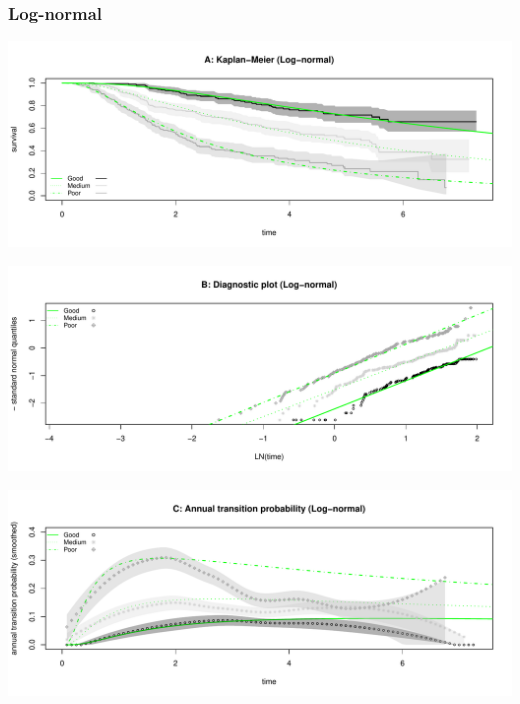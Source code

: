 \documentclass[
]{article}
\begin{document}
\clearpage

\subsubsection{Log-normal}\label{log-normal}

\begin{flushleft}\includegraphics[height=0.25\textheight]{BC_OS_output/Images/Figure_param_models-10} \end{flushleft}

\begin{flushleft}\includegraphics[height=0.25\textheight]{BC_OS_output/Images/Figure_param_models-11} \end{flushleft}

\begin{flushleft}\includegraphics[height=0.25\textheight]{BC_OS_output/Images/Figure_param_models-12} \end{flushleft}
\end{document}
